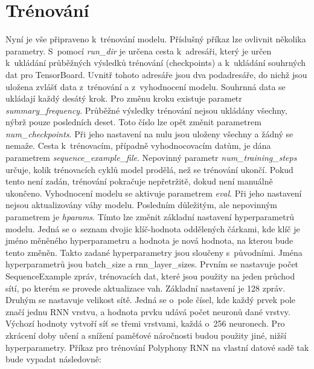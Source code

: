 \section{Trénování}
Nyní je vše připraveno k~trénování modelu.
Příslušný příkaz lze ovlivnit několika parametry.
S~pomocí \emph{run\_dir} je určena cesta k~adresáři,
který je určen k~ukládání průběžných výsledků trénování (checkpoints) 
a k~ukládání souhrných dat pro TensorBoard.
Uvnitř tohoto adresáře jsou dva podadresáře,
do nichž jsou uložena zvlášť data z~trénování a z~vyhodnocení modelu.
Souhrnná data se ukládají každý desátý krok.
Pro změnu kroku existuje parametr \emph{summary\_frequency}.
Průběžné výsledky trénování nejsou ukládány všechny, 
nýbrž pouze posledních deset.
Toto číslo lze opět změnit parametrem \emph{num\_checkpoints}.
Při jeho nastavení na nulu jsou uloženy všechny a žádný se nemaže.
Cesta k~trénovacím, případně vyhodnocovacím datům, 
je dána parametrem \emph{sequence\_example\_file}.
Nepovinný parametr \emph{num\_training\_steps} určuje,
kolik trénovacích cyklů model prodělá, než se trénování ukončí.
Pokud tento není zadán, trénování pokračuje nepřetržitě, 
dokud není manuálně ukončeno.
Vyhodnocení modelu se aktivuje parametrem \emph{eval}.
Při jeho nastavení nejsou aktualizovány váhy modelu.
Posledním důležitým, ale nepovinným parametrem je \emph{hparams}.
Tímto lze změnit základní nastavení hyperparametrů modelu.
Jedná se o~seznam dvojic klíč-hodnota oddělených čárkami,
kde klíč je jméno měněného hyperparametru a hodnota je nová hodnota, 
na kterou bude tento změněn.
Takto zadané hyperparametry jsou sloučeny s~původními.
Jména hyperparametrů jsou batch\_size a rnn\_layer\_sizes.
Prvním se nastavuje počet SequenceExample zpráv, trénovacích dat,
které jsou použity na jeden průchod sítí, po kterém se provede aktualizace vah.
Základní nastavení je 128 zpráv.
Druhým se nastavuje velikost sítě.
Jedná se o~pole čísel, kde každý prvek pole značí jednu RNN vrstvu,
a hodnota prvku udává počet neuronů dané vrstvy.
Výchozí hodnoty vytvoří síť se třemi vrstvami, 
každá o~256 neuronech. 
\cite{google_git_polyphony}
Pro zkrácení doby učení a snížení paměťové náročnosti budou použity jiné, nižší hyperparametry.
Příkaz pro trénování Polyphony RNN na vlastní datové sadě tak bude vypadat následovně:

